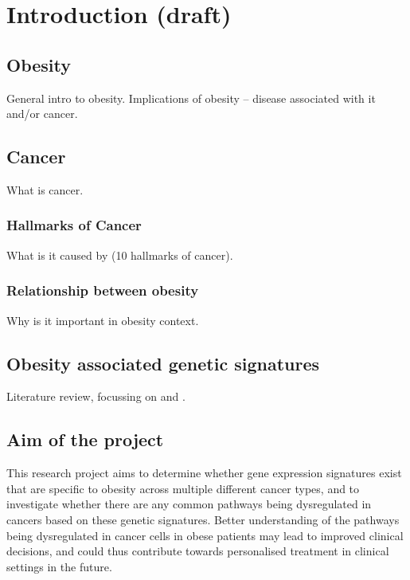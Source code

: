 \chapter{Introduction (draft)}
\label{ch:intro}

\section{Obesity}
\label{sec:obesity}

General intro to obesity.
Implications of obesity -- disease associated with it and/or cancer.

\section{Cancer}
\label{sec:cancer}

What is cancer.

\subsection{Hallmarks of Cancer}
\label{subsec:cancerhallmarks}

What is it caused by (10 hallmarks of cancer).

\subsection{Relationship between obesity}
\label{subsec:obsbackground}

Why is it important in obesity context.

\section{Obesity associated genetic signatures}
\label{sec:obsgene}

Literature review, focussing on \citet{Creighton2012} and \citet{Fuentes-Mattei2014}.

\section{Aim of the project}
\label{sec:aim}

This research project aims to determine whether gene expression signatures exist that are specific to obesity across multiple different cancer types, and to investigate whether there are any common pathways being dysregulated in cancers based on these genetic signatures.
Better understanding of the pathways being dysregulated in cancer cells in obese patients may lead to improved clinical decisions, and could thus contribute towards personalised treatment in clinical settings in the future.


